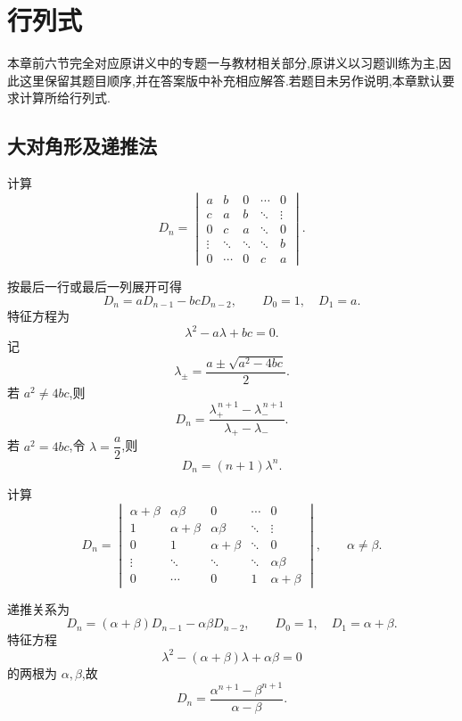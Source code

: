 \setcounter{chapter}{1}
\pagestyle{fancy}

\chapter{行列式}

本章前六节完全对应原讲义中的专题一与教材相关部分,原讲义以习题训练为主,因此这里保留其题目顺序,并在答案版中补充相应解答.若题目未另作说明,本章默认要求计算所给行列式.


\section{大对角形及递推法}

\begin{example}
计算
\[
D_n=
\begin{vmatrix}
a & b & 0 & \cdots & 0\\
c & a & b & \ddots & \vdots\\
0 & c & a & \ddots & 0\\
\vdots & \ddots & \ddots & \ddots & b\\
0 & \cdots & 0 & c & a
\end{vmatrix}.
\]
\end{example}
\exampleblank

\begin{solution}
按最后一行或最后一列展开可得
\[
D_n=aD_{n-1}-bcD_{n-2},
\qquad
D_0=1,\quad D_1=a.
\]
特征方程为
\[
\lambda^2-a\lambda+bc=0.
\]
记
\[
\lambda_{\pm}
=
\dfrac{a\pm\sqrt{a^2-4bc}}{2}.
\]
若 $a^2\neq4bc$,则
\[
D_n
=
\dfrac{\lambda_+^{\,n+1}-\lambda_-^{\,n+1}}
{\lambda_+-\lambda_-}.
\]
若 $a^2=4bc$,令 $\lambda=\dfrac{a}{2}$,则
\[
D_n=(n+1)\lambda^n.
\]
\end{solution}


\begin{example}
计算
\[
D_n=
\begin{vmatrix}
\alpha+\beta & \alpha\beta & 0 & \cdots & 0\\
1 & \alpha+\beta & \alpha\beta & \ddots & \vdots\\
0 & 1 & \alpha+\beta & \ddots & 0\\
\vdots & \ddots & \ddots & \ddots & \alpha\beta\\
0 & \cdots & 0 & 1 & \alpha+\beta
\end{vmatrix},
\qquad
\alpha\neq\beta.
\]
\end{example}
\exampleblank

\begin{solution}
递推关系为
\[
D_n=(\alpha+\beta)D_{n-1}-\alpha\beta D_{n-2},
\qquad
D_0=1,\quad D_1=\alpha+\beta.
\]
特征方程
\[
\lambda^2-(\alpha+\beta)\lambda+\alpha\beta=0
\]
的两根为 $\alpha,\beta$,故
\[
D_n
=
\dfrac{\alpha^{n+1}-\beta^{n+1}}{\alpha-\beta}.
\]
\end{solution}


